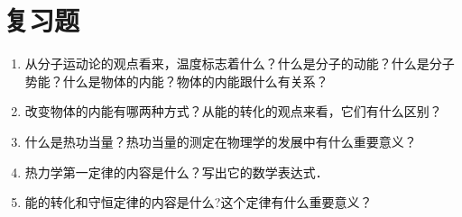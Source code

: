 \section*{复习题}
\begin{enumerate}
	\item 从分子运动论的观点看来，温度标志着什么？什么是分子的动能？什么是分子势能？什么是物体的内能？物体的内能跟什么有关系？
	\item 改变物体的内能有哪两种方式？从能的转化的观点来看，它们有什么区别？
\item 什么是热功当量？热功当量的测定在物理学的发展中有什么重要意义？
\item 热力学第一定律的内容是什么？写出它的数学表达式．
\item 能的转化和守恒定律的内容是什么?这个定律有什么重要意义？
\end{enumerate}












